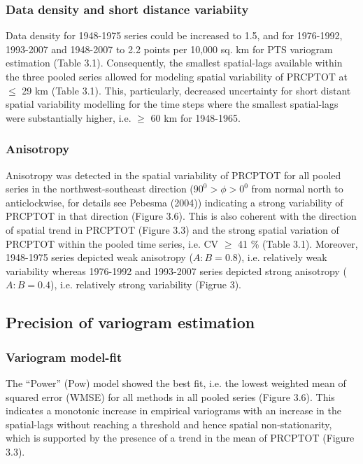 \subsubsection{Data density and short distance variabiity}
\label{Data density and short distance variabiity}

Data density for 1948-1975 series could be increased to 1.5, and for 1976-1992, 1993-2007 and 1948-2007 to 2.2 points per 10,000 sq. km for PTS variogram estimation (Table 3.1). Consequently, the smallest spatial-lags available within the three pooled series allowed for modeling spatial variability of PRCPTOT at $\leq$ 29 km (Table 3.1). This, particularly, decreased uncertainty for short distant spatial variability modelling for the time steps where the smallest spatial-lags were substantially higher, i.e. $\geq$ 60 km for 1948-1965.

\subsubsection{Anisotropy}
\label{Anisotropy}

Anisotropy was detected in the spatial variability of PRCPTOT for all pooled series in the northwest-southeast direction ($90^0>\phi>0^0$ from normal north to anticlockwise, for details see Pebesma (2004)) indicating a strong variability of PRCPTOT in that direction (Figure 3.6). This is also coherent with the direction of spatial trend in PRCPTOT (Figure 3.3) and the strong spatial variation of PRCPTOT within the pooled time series, i.e. CV $\geq$ 41 \% (Table 3.1). Moreover, 1948-1975 series depicted weak anisotropy ($A:B=0.8$), i.e. relatively weak variability whereas 1976-1992 and 1993-2007 series depicted strong anisotropy ($A:B=0.4$), i.e. relatively strong variability (Figrue 3).

\subsection{Precision of variogram estimation}
\label{Precision of variogram estimation}

\subsubsection{Variogram model-fit}
\label{Variogram model-fit}

The “Power” (Pow) model showed the best fit, i.e. the lowest weighted mean of squared error (WMSE) for all methods in all pooled series (Figure 3.6). This indicates a monotonic increase in empirical variograms with an increase in the spatial-lags without reaching a threshold and hence spatial non-stationarity, which is supported by the presence of a trend in the mean of PRCPTOT (Figure 3.3).

